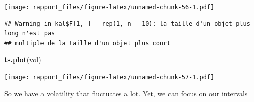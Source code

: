 \documentclass[]{article}
\newenvironment{Shaded}{\begin{snugshade}}{\end{snugshade}}
\newcommand{\KeywordTok}[1]{\textcolor[rgb]{0.13,0.29,0.53}{\textbf{#1}}}
\newcommand{\DataTypeTok}[1]{\textcolor[rgb]{0.13,0.29,0.53}{#1}}
\newcommand{\DecValTok}[1]{\textcolor[rgb]{0.00,0.00,0.81}{#1}}
\newcommand{\CommentTok}[1]{\textcolor[rgb]{0.56,0.35,0.01}{\textit{#1}}}
\newcommand{\OperatorTok}[1]{\textcolor[rgb]{0.81,0.36,0.00}{\textbf{#1}}}
\newcommand{\NormalTok}[1]{#1}
\begin{document}
\begin{Shaded}
\end{Shaded}

\texttt{[image: rapport\_files/figure-latex/unnamed-chunk-56-1.pdf]}

\begin{Shaded}
\end{Shaded}

\begin{verbatim}
## Warning in kal$F[1, ] - rep(1, n - 10): la taille d'un objet plus long n'est pas
## multiple de la taille d'un objet plus court
\end{verbatim}

\begin{Shaded}
\begin{Highlighting}[]
\KeywordTok{ts.plot}\NormalTok{(vol)}
\end{Highlighting}
\end{Shaded}

\texttt{[image: rapport\_files/figure-latex/unnamed-chunk-57-1.pdf]}

So we have a volatility that fluctuates a lot. Yet, we can focus on our
intervals
\end{document}
